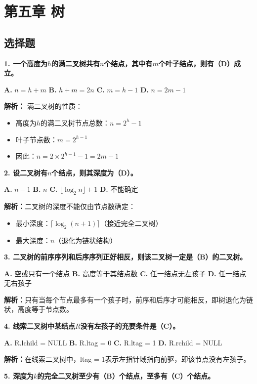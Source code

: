 \documentclass[12pt,a4paper]{amsart}
\begin{document}
\section{第五章 树}

\subsection{选择题}

\textbf{1. 一个高度为$h$的满二叉树共有$n$个结点，其中有$m$个叶子结点，则有（D）成立。}

\textbf{A.} $n=h+m$
\textbf{B.} $h+m=2n$  
\textbf{C.} $m=h-1$
\textbf{D.} $n=2m-1$

\textbf{解析：}
满二叉树的性质：
\begin{itemize}
\item 高度为$h$的满二叉树节点总数：$n = 2^h - 1$
\item 叶子节点数：$m = 2^{h-1}$
\item 因此：$n = 2 \times 2^{h-1} - 1 = 2m - 1$
\end{itemize}

\textbf{2. 设二叉树有$n$个结点，则其深度为（D）。}

\textbf{A.} $n-1$
\textbf{B.} $n$
\textbf{C.} $\lfloor\log_2 n\rfloor+1$
\textbf{D.} 不能确定

\textbf{解析：}二叉树的深度不能仅由节点数确定：
\begin{itemize}
\item 最小深度：$\lceil \log_2(n+1) \rceil$（接近完全二叉树）
\item 最大深度：$n$（退化为链状结构）
\end{itemize}

\textbf{3. 二叉树的前序序列和后序序列正好相反，则该二叉树一定是（B）的二叉树。}

\textbf{A.} 空或只有一个结点
\textbf{B.} 高度等于其结点数
\textbf{C.} 任一结点无左孩子
\textbf{D.} 任一结点无右孩子

\textbf{解析：}只有当每个节点最多有一个孩子时，前序和后序才可能相反，即树退化为链状，高度等于节点数。

\textbf{4. 线索二叉树中某结点$R$没有左孩子的充要条件是（C）。}

\textbf{A.} R.lchild = NULL
\textbf{B.} R.ltag = 0
\textbf{C.} R.ltag = 1
\textbf{D.} R.rchild = NULL

\textbf{解析：}在线索二叉树中，ltag = 1表示左指针域指向前驱，即该节点没有左孩子。

\textbf{5. 深度为$k$的完全二叉树至少有（B）个结点，至多有（C）个结点。}
\end{document}
